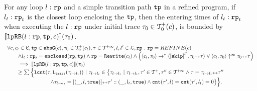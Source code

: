 
\begin{lemma}
  \label{lemma:looprb-sound}
  For any loop $l: \mathtt{rp}$ and a simple transition path $\mathtt{tp}$ in a refined program, if $l_t: \mathtt{rp}_t$ is the closest loop enclosing the $\mathtt{tp}$, then the entering times of $l_t: \mathtt{rp}_t$ when executing the $l: \mathtt{rp}$ under initial trace $\mathtt{\tau}_0 \in \mathcal{T}^{+}_0(c)$, is bounded by $\llbracket \mathtt{lpRB}(l: \mathtt{rp}, \mathtt{tp}, c) \rrbracket(\mathtt{\tau}_0)$.
  \[
    \begin{array}{l}
    \forall c, c_l \in \cdom, \tpath \in \absG(c), \trace_0 \in \ftdom_0(c_l), \trace \in \tdom, l, l' \in \ldom, \rprog \st 
    \rprog = REFINE(c)
    \\ \qquad
    \land l_t: \rprog_t = \kw{enclosed}(\rprog, \tpath)
    \land 
    \rprog = \algrewrite(c_l)
    \land
    \Big(
    \config{c_l, \trace_0} \to^* \config{\clabel{\eskip}^{l'}, \trace_0 \tracecat \trace}
    \lor \config{c_l, \trace_0} \uparrow^{\infty} \trace_0 \tracecat \trace 
    \Big)
    \\ \qquad
    \implies
    \econfig{\lpchB(l: \rprog, \tpath, c)}(\trace_0) 
    \\ \qquad \geq 
      \sum\Big\{
      \lcounter(\trace, \tracel(\trace_{l \to l_t})) ~\vert~ \trace_{l \to l_t} \in 
      \big\{\trace_{l \to l_t} ~\vert~ 
      \trace_{l \to l_t}, \trace' \in \ftdom, \trace'' \in \tdom
      \land \trace = \trace_{l \to l_t} \tracecat \trace''
      \\ \qquad \qquad \qquad \qquad
      \land \trace_{l \to l_t} = [(\_, l, \etrue)] \tracecat \trace' :: (\_, l_t, \etrue)
      \land \counter(\trace', l) = \counter(\trace', l_t) = 0 
      \big\}
      \Big\}.
\end{array}
  \]
  \end{lemma}
